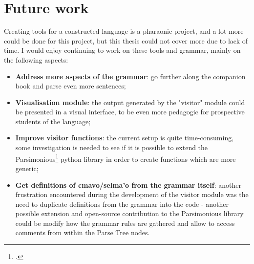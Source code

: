 \chapter{Future work}

\vspace{0.5cm}

Creating tools for a constructed language is a pharaonic project, and a lot more could be done for this project,
but this thesis could not cover more due to lack of time. I would enjoy continuing to work on these tools and grammar,
mainly on the following aspects:

\begin{itemize}
\item \textbf{Address more aspects of the grammar}: go further along the companion book and parse even more sentences;
\item \textbf{Visualisation module}: the output generated by the "visitor" module could be presented in a visual interface,
to be even more pedagogic for prospective students of the language;
\item \textbf{Improve visitor functions}: the current setup is quite time-consuming, some investigation is needed to see if
it is possible to extend the Parsimonious\footcite{parsimonious} python library in order to create functions which are more generic;
\item \textbf{Get definitions of cmavo/selma'o from the grammar itself}: another frustration encountered during the development of
the visitor module was the need to duplicate definitions from the grammar into the code - another possible extension and
open-source contribution to the Parsimonious library could be modify how the grammar rules are gathered and allow to access
comments from within the Parse Tree nodes.
\end{itemize}